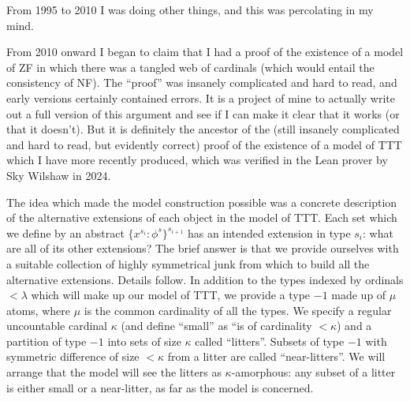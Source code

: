 \documentclass{slides}
\begin{document}
\begin{slide}

From 1995 to 2010 I was doing other things, and this was percolating in my mind.

From 2010 onward I began to claim that I had a proof of the existence of a model of ZF in which there was a tangled web of cardinals (which would entail the consistency of NF).  The ``proof'' was insanely complicated and hard to read, and early versions certainly contained errors.   It is a project of mine to actually write out a full version of this argument and see if I can make it clear that it works (or that it doesn't).  But it is definitely the ancestor of the (still insanely complicated and hard to read, but evidently correct) proof of the existence of a model of TTT which I have more recently produced, which was verified in the Lean prover by Sky Wilshaw in 2024.

\end{slide}

\begin{slide}

The idea which made the model construction possible was a concrete description of the alternative extensions of each object in the model of TTT.  Each set which we define by an abstract $\{x ^{s_i}:\phi^s\}^{s_{i+1}}$
has an intended extension in type $s_i$:  what are all of its other extensions?  The brief answer is that we provide ourselves with a suitable collection of highly symmetrical junk from which to build all the alternative extensions.  Details follow.  In addition to the types indexed by ordinals $<\lambda$ which will make up our model of TTT, we provide a type $-1$ made up of $\mu$ atoms, where $\mu$ is the common cardinality of all the types.   We specify a regular uncountable cardinal $\kappa$ (and define ``small'' as ``is of cardinality $<\kappa$) and a partition of type $-1$ into sets of size $\kappa$ called ``litters''.  Subsets of type $-1$ with symmetric difference of size $<\kappa$ from a litter are called ``near-litters''.  We will arrange that the model will see the litters as $\kappa$-amorphous:  any subset of a litter is either small or a near-litter, as far as the model is concerned.

\end{slide}
\end{document}
